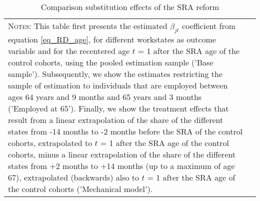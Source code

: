 \documentclass[12pt,a4paper]{article}
\begin{document}
\begin{table}[!t]	
	\caption{Comparison substitution effects of the SRA reform}
	\footnotesize
	\label{table_RD_substitution}
	\begin{adjustbox}{max width = \textwidth, max totalheight=.7\textheight, keepaspectratio}
		\hspace*{-1cm}
		
		\hspace*{-1cm}
	\end{adjustbox}
	\vspace*{0.2cm}
	\scriptsize
	\begin{tabular}{ll}
		\begin{minipage}{14cm}%
	\textsc{Notes:}  This table first presents the estimated $\beta_{jt}$ coefficient from equation \ref{eq_RD_age}, for different workstates as outcome variable and for the recentered age $t$ = 1 after the SRA age of the control cohorts, using the pooled estimation sample ('Base sample'). Subsequently, we show the estimates restricting the sample of estimation to individuals that are employed between ages 64 years and 9 months and 65 years and 3 months ('Employed at 65'). Finally, we show the treatment effects that result from a linear extrapolation of the share of the different states from -14 months to -2 months before the SRA of the control cohorts, extrapolated to $t$ = 1 after the SRA age of the control cohorts, minus a linear extrapolation of the share of the different states from +2 months to +14 months (up to a maximum of age 67), extrapolated (backwards) also to $t$ = 1 after the SRA age of the control cohorts ('Mechanical model').
		\end{minipage}%
	\end{tabular}
	\normalsize
\end{table}
\end{document}
